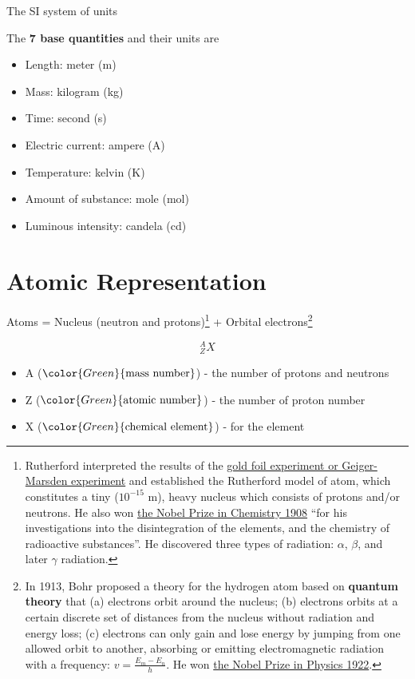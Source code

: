 \documentclass[]{book}
\providecommand{\tightlist}{%
  \setlength{\itemsep}{0pt}\setlength{\parskip}{0pt}}
\let\rmarkdownfootnote\footnote%
\def\footnote{\protect\rmarkdownfootnote}
\theoremstyle{definition}
\theoremstyle{definition}
\theoremstyle{definition}
\theoremstyle{remark}
\begin{document}
The SI system of units

The \textbf{7 base quantities} and their units are

\begin{itemize}
\tightlist
\item
  Length: meter (m)
\item
  Mass: kilogram (kg)
\item
  Time: second (s)
\item
  Electric current: ampere (A)
\item
  Temperature: kelvin (K)
\item
  Amount of substance: mole (mol)
\item
  Luminous intensity: candela (cd)
\end{itemize}

\section{Atomic Representation}\label{atomic-rep}

Atoms = Nucleus (neutron and protons)\footnote{Rutherford interpreted
  the results of the
  \href{https://en.wikipedia.org/wiki/Geiger\%E2\%80\%93Marsden_experiment}{gold
  foil experiment or Geiger-Marsden experiment} and established the
  Rutherford model of atom, which constitutes a tiny (\(10^{-15}\) m),
  heavy nucleus which consists of protons and/or neutrons. He also won
  \href{https://www.nobelprize.org/nobel_prizes/chemistry/laureates/1908/}{the
  Nobel Prize in Chemistry 1908} ``for his investigations into the
  disintegration of the elements, and the chemistry of radioactive
  substances''. He discovered three types of radiation: \(\alpha\),
  \(\beta\), and later \(\gamma\) radiation.} + Orbital
electrons\footnote{In 1913, Bohr proposed a theory for the hydrogen atom
  based on \textbf{quantum theory} that (a) electrons orbit around the
  nucleus; (b) electrons orbits at a certain discrete set of distances
  from the nucleus without radiation and energy loss; (c) electrons can
  only gain and lose energy by jumping from one allowed orbit to
  another, absorbing or emitting electromagnetic radiation with a
  frequency: \(v=\frac{E_m-E_n}{h}\). He won
  \href{https://www.nobelprize.org/nobel_prizes/physics/laureates/1922/}{the
  Nobel Prize in Physics 1922}.}

\[^A_ZX\]

\begin{itemize}
\tightlist
\item
  A (\(\color{Green}{\text{mass\ number}}\)) - the number of protons and
  neutrons
\item
  Z (\(\color{Green}{\text{atomic\ number}}\)) - the number of proton
  number
\item
  X (\(\color{Green}{\text{chemical\ element}}\)) - for the element
\end{itemize}
\end{document}
